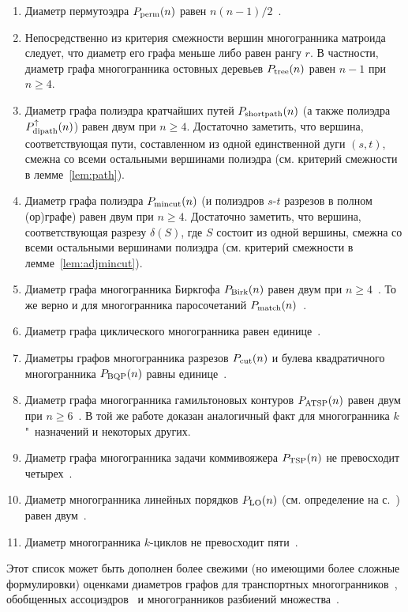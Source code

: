 \begin{enumerate}
\item Диаметр пермутоэдра $P_{\textup{perm}}(n)$ равен $n(n-1)/2$~\cite{Emelichev:1981}.
\item Непосредственно из критерия смежности вершин многогранника матроида следует, что диаметр его графа меньше либо равен рангу $r$. В частности, диаметр графа многогранника остовных деревьев $P_{\textup{tree}}(n)$ равен $n-1$ при $n \ge 4$.
\item Диаметр графа полиэдра кратчайших путей $P_{\textup{shortpath}}(n)$ (а также полиэдра $P_{\textup{dipath}}^{\uparrow}(n)$) равен двум при $n\ge 4$. Достаточно заметить, что вершина, соответствующая пути, составленном из одной единственной дуги $(s,t)$, смежна со всеми остальными вершинами полиэдра (см. критерий смежности в лемме~\ref{lem:path}).
\item Диаметр графа полиэдра $P_{\textup{mincut}}(n)$ (и полиэдров $s$-$t$ разрезов в полном (ор)гра\-фе) равен двум при $n\ge 4$. Достаточно заметить, что вершина, соответствующая разрезу $\delta(S)$, где $S$ состоит из одной вершины, смежна со всеми остальными вершинами полиэдра (см. критерий смежности в лемме~\ref{lem:adjmincut}).
\item Диаметр графа многогранника Биркгофа $P_{\textup{Birk}}(n)$ равен двум при $n \ge 4$~\cite{Balinski:1974}. То же верно и для многогранника паросочетаний $P_{\textup{match}}(n)$~\cite{PadbergRao:1974}.
\item Диаметр графа циклического многогранника равен единице~\cite{Gale:1963}.
\item Диаметры графов многогранника разрезов $P_{\textup{cut}}(n)$ и булева квадратичного многогранника $P_{\textup{BQP}}(n)$ равны единице~\cite{Bondarenko:1987,Beloshevskii:1986,Barahona:1986,Padberg:1989}.
\item Диаметр графа многогранника гамильтоновых контуров $P_{\textup{ATSP}}(n)$ равен двум при $n \ge 6$~\cite{PadbergRao:1974}.
В той же работе доказан аналогичный факт для многогранника $k$"~назначений и некоторых других.
\item Диаметр графа многогранника задачи коммивояжера $P_{\textup{TSP}}(n)$ не превосходит четырех~\cite{RispoliCosares:1998}.
\item Диаметр многогранника линейных порядков $P_{\textup{LO}}(n)$ (см. определение на с.~\pageref{def:LOP}) равен двум~\cite{Young:1978}.
\item Диаметр многогранника $k$-циклов не превосходит пяти~\cite{Girlich:2006}.
\end{enumerate}
Этот список может быть дополнен более свежими (но имеющими более сложные формулировки) оценками диаметров графов для транспортных многогранников~\cite{Borgwardt:2015, DeLoera:2014, Kim:2010},
обобщенных ассоциэдров~\cite{Ceballos:2015,Ceballos:2016} и многогранников разбиений множества~\cite{Borgwardt:2013}.

